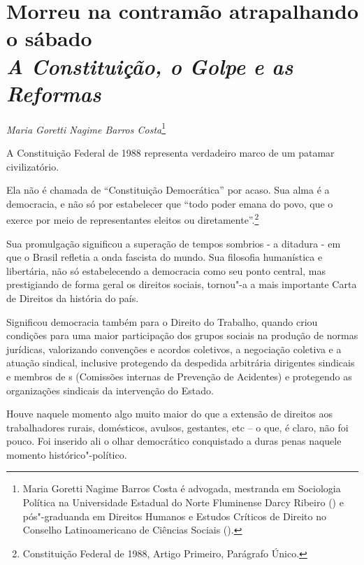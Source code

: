 \chapter*{Morreu na contramão atrapalhando o sábado\\
\emph{A Constituição, o Golpe e as Reformas}}


\begin{flushright}
\emph{Maria Goretti Nagime Barros Costa}\footnote{Maria Goretti
Nagime Barros Costa é advogada, mestranda em
Sociologia Política na Universidade Estadual do Norte Fluminense Darcy
Ribeiro () e pós"-graduanda em Direitos Humanos e Estudos Críticos de
Direito no Conselho Latinoamericano de Ciências Sociais ().}
\end{flushright}

A Constituição Federal de 1988 representa verdadeiro marco de um patamar
civilizatório.

Ela não é chamada de ``Constituição Democrática'' por acaso. Sua alma é
a democracia, e não só por estabelecer que ``todo poder emana do povo,
que o exerce por meio de representantes eleitos ou
diretamente''.\footnote{Constituição Federal de 1988, Artigo Primeiro,
  Parágrafo Único.}

Sua promulgação significou a superação de tempos sombrios - a ditadura -
em que o Brasil refletia a onda fascista do mundo. Sua filosofia
humanística e libertária, não só estabelecendo a democracia como seu
ponto central, mas prestigiando de forma geral os direitos sociais,
tornou"-a a mais importante Carta de Direitos da história do país.

Significou democracia também para o Direito do Trabalho, quando criou
condições para uma maior participação dos grupos sociais na produção de
normas jurídicas, valorizando convenções e acordos coletivos, a
negociação coletiva e a atuação sindical, inclusive protegendo da
despedida arbitrária dirigentes sindicais e membros de s (Comissões
internas de Prevenção de Acidentes) e protegendo as organizações
sindicais da intervenção do Estado.

Houve naquele momento algo muito maior do que a extensão de direitos aos
trabalhadores rurais, domésticos, avulsos, gestantes, etc -- o que, é
claro, não foi pouco. Foi inserido ali o olhar democrático conquistado a
duras penas naquele momento histórico"-político.

